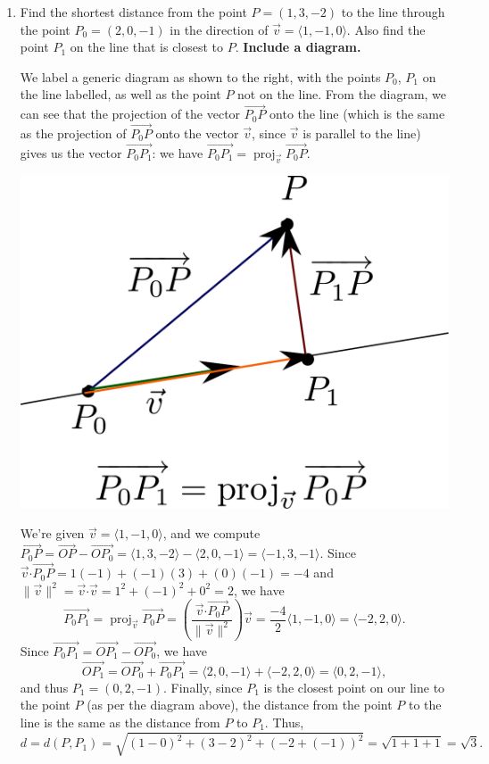 \documentclass[12pt]{article}
\newcommand{\len}[1]{\lVert #1\rVert}
\newcommand{\dotp}{\boldsymbol{\cdot}}
\DeclareMathOperator{\proj}{proj}
\begin{document}
\begin{enumerate}
\newpage

\item Find the shortest distance from the point $P=(1,3,-2)$ to the line through the point $P_0 = (2,0,-1)$ in the direction of $\vec{v} = \langle 1,-1,0\rangle$. Also find the point $P_1$ on the line that is closest to $P$. {\bf Include a diagram.}

\bigskip

\begin{multicols}{2}
 We label a generic diagram as shown to the right, with the points $P_0$, $P_1$ on the line labelled, as well as the point $P$ not on the line. From the diagram, we can see that the projection of the vector $\overrightarrow{P_0P}$ onto the line (which is the same as the projection of $\overrightarrow{P_0P}$ onto the vector $\vec{v}$, since $\vec{v}$ is parallel to the line) gives us the vector $\overrightarrow{P_0P_1}$: we have $\overrightarrow{P_0P_1} = \proj_{\vec{v}}\overrightarrow{P_0P}$.
\columnbreak

\begin{center}
 \includegraphics[width=0.7\columnwidth]{WS3-3}
\end{center}
\end{multicols}
We're given $\vec{v} = \langle 1,-1,0\rangle$, and we compute $\overrightarrow{P_0P}=\overrightarrow{OP}-\overrightarrow{OP_0} = \langle 1, 3, -2\rangle-\langle 2, 0, -1\rangle =\langle -1, 3, -1\rangle$. Since $\vec{v}\dotp \overrightarrow{P_0P} = 1(-1)+(-1)(3)+(0)(-1) = -4$ and $\len{\vec{v}}^2 = \vec{v}\dotp\vec{v} = 1^2+(-1)^2+0^2 = 2$, we have
\[
 \overrightarrow{P_0P_1} = \proj_{\vec{v}}\overrightarrow{P_0P} = \left(\frac{\vec{v}\dotp \overrightarrow{P_0P}}{\len{\vec{v}}^2}\right)\vec{v} = \frac{-4}{2}\langle 1, -1, 0\rangle = \langle -2, 2, 0\rangle.
\]
Since $\overrightarrow{P_0P_1} = \overrightarrow{OP_1}-\overrightarrow{OP_0}$, we have
\[
 \overrightarrow{OP_1} = \overrightarrow{OP_0}+\overrightarrow{P_0P_1} = \langle 2, 0, -1\rangle + \langle -2, 2, 0\rangle = \langle 0, 2, -1\rangle,
\]
and thus $P_1 = (0,2,-1)$. Finally, since $P_1$ is the closest point on our line to the point $P$ (as per the diagram above), the distance from the point $P$ to the line is the same as the distance from $P$ to $P_1$. Thus,
\[
 d = d(P,P_1) = \sqrt{(1-0)^2+(3-2)^2+(-2+(-1))^2} = \sqrt{1+1+1}=\sqrt{3}.
\]


\end{enumerate}
\end{document}
